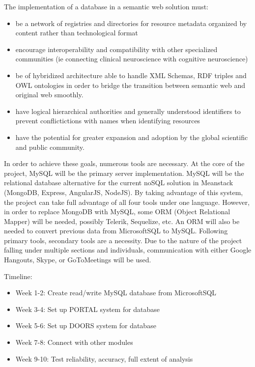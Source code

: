 \documentclass[12pt]{article}
\begin{document}
	The implementation of a database in a semantic web solution must:
\begin{itemize}
\item be a network of registries and directories for resource metadata organized by content rather than technological format
\item encourage interoperability and compatibility with other specialized communities (ie connecting clinical neuroscience with cognitive neuroscience)
\item be of hybridized architecture able to handle XML Schemas, RDF triples and OWL ontologies in order to bridge the transition between semantic web and original web smoothly. 
\item have logical hierarchical authorities and generally understood identifiers
to prevent conflictictions with names when identifying resources 
\item have the potential for greater expansion and adoption by the global scientific and public community. 
\end{itemize}

	In order to achieve these goals, numerous tools are necessary. At the core of the project, MySQL will be the primary server implementation. MySQL will be the relational database alternative for the current noSQL solution in Meanstack (MongoDB, Express, AngularJS, NodeJS). By taking advantage of this system, the project can take full advantage of all four tools under one language. However, in order to replace MongoDB with MySQL, some ORM (Object Relational Mapper) will be needed, possibly Telerik, Sequelize, etc. An ORM will also be needed to convert previous data from MicrosoftSQL to MySQL. Following primary tools, secondary tools are a necessity. Due to the nature of the project falling under multiple sections and individuals, communication with either Google Hangouts, Skype, or GoToMeetings will be used. 

\hfill


Timeline:
\begin{itemize}
	\item Week 1-2: Create read/write MySQL database from MicrosoftSQL
	\item Week 3-4: Set up PORTAL system for database
	\item Week 5-6: Set up DOORS system for database
	\item Week 7-8: Connect with other modules 
	\item Week 9-10: Test reliability, accuracy, full extent of analysis
\end{itemize}
\end{document}
